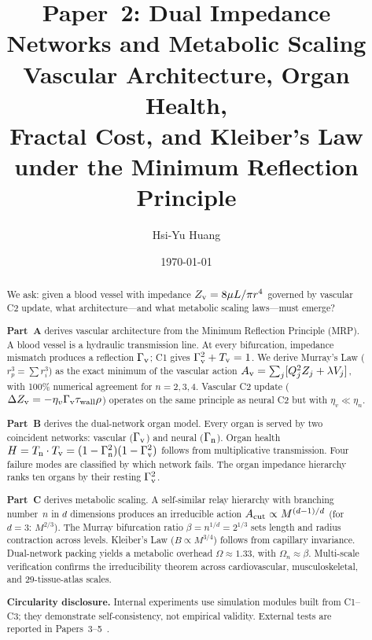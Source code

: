 \documentclass[aps,pre,twocolumn,superscriptaddress,floatfix]{revtex4-2}
\begin{document}
\title{%
Paper~2: Dual Impedance Networks and Metabolic Scaling\\[2pt]
Vascular Architecture, Organ Health,\\
Fractal Cost, and Kleiber's Law\\[4pt]
\large under the Minimum Reflection Principle%
}

\author{Hsi-Yu Huang}

\date{\today}

\begin{abstract}
We ask: given a blood vessel with impedance
$Z_{\text{v}} = 8\mu L/\pi r^4$ governed by vascular C2 update,
what architecture---and what metabolic scaling laws---must
emerge?

\textbf{Part~A} derives vascular architecture from the
Minimum Reflection Principle (MRP).
A blood vessel is a hydraulic transmission line.
At every bifurcation, impedance mismatch produces a
reflection $\Gamma_{\text{v}}$; C1 gives $\Gamma_{\text{v}}^2 + T_{\text{v}} = 1$.
We derive Murray's Law ($r_p^3 = \sum r_i^3$) as the
exact minimum of the vascular action
$A_{\text{v}} = \sum_j[Q_j^2 Z_j + \lambda V_j]$, with 100\%
numerical agreement for $n=2,3,4$.
Vascular C2 update ($\Delta Z_{\text{v}}=-\eta_v\Gamma_{\text{v}}\tau_{\text{wall}}\rho$)
operates on the same principle as neural C2 but with
$\eta_v \ll \eta_n$.

\textbf{Part~B} derives the dual-network organ model.
Every organ is served by two coincident networks:
vascular ($\Gamma_{\text{v}}$) and neural ($\Gamma_{\text{n}}$).
Organ health $H = T_{\text{n}}\cdot T_{\text{v}} = (1-\Gamma_{\text{n}}^2)(1-\Gamma_{\text{v}}^2)$
follows from multiplicative transmission.
Four failure modes are classified by which network fails.
The organ impedance hierarchy ranks ten organs by their
resting $\Gamma_{\text{v}}^2$.

\textbf{Part~C} derives metabolic scaling.
A self-similar relay hierarchy with branching number~$n$
in $d$ dimensions produces an irreducible action
$A_{\text{cut}} \propto M^{(d-1)/d}$ (for $d=3$: $M^{2/3}$).
The Murray bifurcation ratio $\beta = n^{1/d} = 2^{1/3}$
sets length and radius contraction across levels.
Kleiber's Law ($B \propto M^{3/4}$) follows from
capillary invariance.
Dual-network packing yields a metabolic overhead
$\Omega \approx 1.33$, with $\Omega_n \approx \beta$.
Multi-scale verification confirms the irreducibility
theorem across cardiovascular, musculoskeletal, and
29-tissue-atlas scales.



\medskip\noindent
\textbf{Circularity disclosure.}
Internal experiments use simulation modules built from
C1--C3; they demonstrate self-consistency, not empirical
validity.
External tests are reported in
Papers~3--5~\cite{Paper3,Paper4,Paper5}.
\end{abstract}
\end{document}
